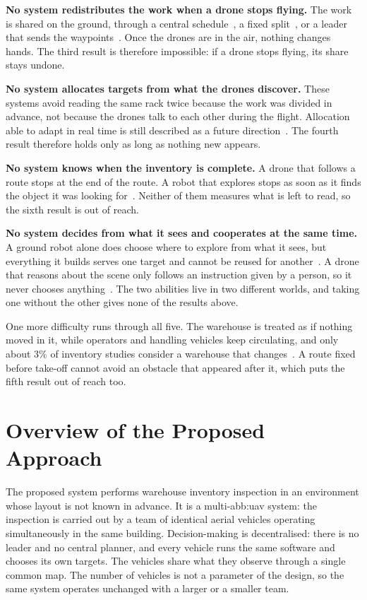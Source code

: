\textbf{No system redistributes the work when a drone stops flying.} The work is
shared on the ground, through a central schedule~\cite{guinand2021uavugv}, a
fixed split~\cite{pore2026uavqr}, or a leader that sends the
waypoints~\cite{chandran2024network}. Once the drones are in the air, nothing
changes hands. The third result is therefore impossible: if a drone stops flying,
its share stays undone.

\textbf{No system allocates targets from what the drones discover.} These systems
avoid reading the same rack twice because the work was divided in advance, not
because the drones talk to each other during the flight. Allocation able to adapt
in real time is still described as a future
direction~\cite{kumar2025comprehensive}. The fourth result therefore holds only
as long as nothing new appears.

\textbf{No system knows when the inventory is complete.} A drone that follows a
route stops at the end of the route. A robot that explores stops as soon as it
finds the object it was looking for~\cite{yokoyama2024vlfm}. Neither of them
measures what is left to read, so the sixth result is out of reach.

\textbf{No system decides from what it sees and cooperates at the same time.} A
ground robot alone does choose where to explore from what it sees, but everything
it builds serves one target and cannot be reused for
another~\cite{yokoyama2024vlfm, yu2023l3mvn}. A drone that reasons about the
scene only follows an instruction given by a person, so it never chooses
anything~\cite{chen2024typefly}. The two abilities live in two different worlds,
and taking one without the other gives none of the results above.

One more difficulty runs through all five. The warehouse is treated as if nothing
moved in it, while operators and handling vehicles keep circulating, and only
about 3\% of inventory studies consider a warehouse that
changes~\cite{pore2026drone}. A route fixed before take-off cannot avoid an
obstacle that appeared after it, which puts the fifth result out of reach too.
\section{Overview of the Proposed Approach}%
\label{sec:sys:overview}

The proposed system performs warehouse inventory inspection in an environment
whose layout is not known in advance. It is a multi-\gls{abb:uav} system: the
inspection is carried out by a team of identical aerial vehicles operating
simultaneously in the same building. Decision-making is decentralised: there is no leader and no central planner, and every vehicle runs the same software and chooses its own targets. The vehicles share what they observe through a single common map. The number of vehicles is not a parameter of the design, so
the same system operates unchanged with a larger or a smaller team.

